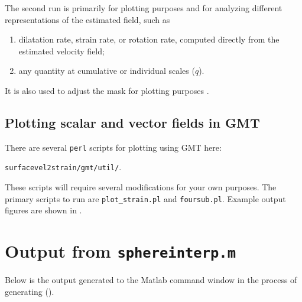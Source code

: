 \documentclass[11pt,titlepage,fleqn]{article}
\begin{document}
The second run is primarily for plotting purposes and for analyzing different representations of the estimated field, such as 
%
\begin{enumerate}
\item dilatation rate, strain rate, or rotation rate, computed directly from the estimated velocity field;
\item any quantity at cumulative or individual scales ($q$).
\end{enumerate}
%
It is also used to adjust the mask for plotting purposes \citep{Tape2009gps}.


\subsection*{Plotting scalar and vector fields in GMT}

There are several \verb+perl+ scripts for plotting using GMT \citep{GMT} here:

\verb+surfacevel2strain/gmt/util/+.

\noindent
These scripts will require several modifications for your own purposes.
The primary scripts to run are \verb+plot_strain.pl+ and \verb+foursub.pl+.
Example output figures are shown in .

\pagebreak
{}




\appendix
\section{Output from {\tt sphereinterp.m}}
\label{sec:sphereinterp_out}

Below is the output generated to the Matlab command window in the process of generating  ().
\end{document}
